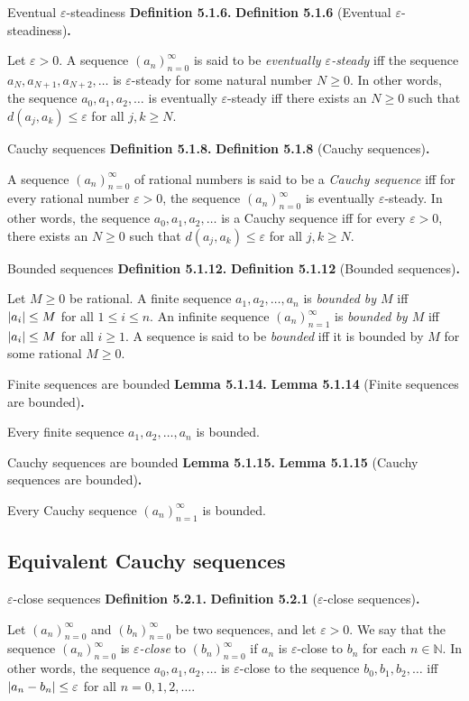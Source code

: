 \documentclass[12pt]{article}
\newenvironment{df}[2][\relax]{
\vspace{4mm}
    \noindent\setlength{\parskip}{1em}%
    \ifx#1\relax%
        \textbf{#2. }%
    \else%
        \textbf{#2} (#1)\textbf{. }%
    \fi%
    \ignorespaces%
}{}
\theoremstyle{remark}
\begin{document}
\begin{df}[Eventual $\varepsilon$-steadiness]{Definition 5.1.6}
    Let $\varepsilon > 0$.
    A sequence $(a_n)^\infty_{n=0}$ is said to be \emph{eventually $\varepsilon$-steady} iff the sequence $a_N, a_{N+1}, a_{N+2}, \ldots$ is $\varepsilon$-steady for some natural number $N \ge 0$.
    In other words, the sequence $a_0, a_1, a_2, \ldots$ is eventually $\varepsilon$-steady iff there exists an $N \ge 0$ such that $d(a_j, a_k) \le \varepsilon$ for all $j, k \ge N$.
\end{df}


\begin{df}[Cauchy sequences]{Definition 5.1.8}
    A sequence $(a_n)^\infty_{n=0}$ of rational numbers is said to be a \emph{Cauchy sequence}
    iff for every rational number $\varepsilon > 0$,
    the sequence $(a_n)^\infty_{n=0}$ is eventually $\varepsilon$-steady.
    In other words, the sequence $a_0, a_1, a_2, \ldots$ is a Cauchy sequence iff for every $\varepsilon > 0$, there exists an $N \ge 0$ such that $d(a_j, a_k) \le \varepsilon$ for all $j, k \ge N$.
\end{df}


\begin{df}[Bounded sequences]{Definition 5.1.12}
    Let $M \ge 0$ be rational.
    A finite sequence $a_1, a_2, \ldots, a_n$ is \emph{bounded by $M$} iff $\abs{a_i} \le M$ for all $1 \le i \le n$.
    An infinite sequence $(a_n)^\infty_{n=1}$ is \emph{bounded by $M$} iff $\abs{a_i} \le M$ for all $i \ge 1$.
    A sequence is said to be \emph{bounded} iff it is bounded by $M$ for some rational $M \ge 0$.
\end{df}


\begin{df}[Finite sequences are bounded]{Lemma 5.1.14}
    Every finite sequence $a_1, a_2, \ldots, a_n$ is bounded.
\end{df}


\begin{df}[Cauchy sequences are bounded]{Lemma 5.1.15}
    Every Cauchy sequence $(a_n)^\infty_{n=1}$ is bounded.
\end{df}


\subsection{Equivalent Cauchy sequences}

\begin{df}[$\varepsilon$-close sequences]{Definition 5.2.1}
    Let $(a_n)^\infty_{n=0}$ and $(b_n)^\infty_{n=0}$ be two sequences, and let $\varepsilon > 0$.
    We say that the sequence $(a_n)^\infty_{n=0}$ is \emph{$\varepsilon$-close} to $(b_n)^\infty_{n=0}$ if $a_n$ is $\varepsilon$-close to $b_n$ for each $n \in \mathbb{N}$.
    In other words, the sequence $a_0, a_1, a_2, \ldots$ is $\varepsilon$-close to the sequence $b_0, b_1, b_2, \ldots$ iff $\abs{a_n - b_n} \le \varepsilon$ for all $n = 0, 1, 2, \ldots$.
\end{df}
\end{document}
